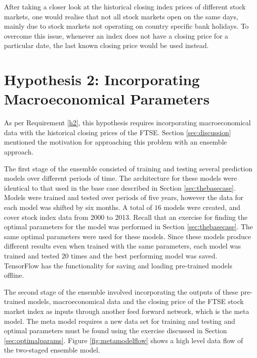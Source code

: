 \documentclass{UoYCSproject}
\begin{document}
After taking a closer look at the historical closing index prices of different stock markets, one would realise that not all stock markets open on the same days, mainly due to stock markets not operating on country specific bank holidays. To overcome this issue, whenever an index does not have a closing price for a particular date, the last known closing price would be used instead.  

\section{Hypothesis 2: Incorporating Macroeconomical Parameters}
\label{sec:methodh2}
As per Requirement \ref{h2}, this hypothesis requires incorporating macroeconomical data with the historical closing prices of the FTSE. Section \ref{sec:discussion} mentioned the motivation for approaching this problem with an ensemble approach. 

The first stage of the ensemble consisted of training and testing several prediction models over different periods of time. The architecture for these models were identical to that used in the base case described in Section \ref{sec:thebasecase}. Models were trained and tested over periods of five years, however the data for each model was shifted by six months. A total of $16$ models were created, and cover stock index data from 2000 to 2013. Recall that an exercise for finding the optimal parameters for the model was performed in Section \ref{sec:thebasecase}. The same optimal parameters were used for these models. Since these models produce different results even when trained with the same parameters, each model was trained and tested $20$ times and the best performing model was saved. TensorFlow has the functionality for saving and loading pre-trained models offline.

The second stage of the ensemble involved incorporating the outputs of these pre-trained models, macroeconomical data and the closing price of the FTSE stock market index as inputs through another feed forward network, which is the meta model. The meta model requires a new data set for training and testing and optimal parameters must be found using the exercise discussed in Section \ref{sec:optimalparams}. Figure \ref{fig:metamodelflow} shows a high level data flow of the two-staged ensemble model.
\end{document}
